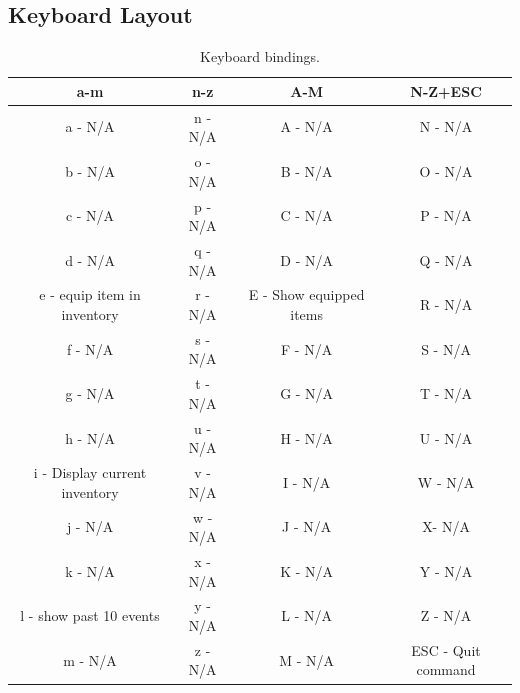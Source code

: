 \documentclass{report}
\begin{document}
\subsection{Keyboard Layout}
\begin{table}[h!]
\centering
\begin{tabular}{|c| c| c |c|} 
\hline
 a-m & n-z & A-M & N-Z+ESC \\ [0.5ex] 
 \hline
 a - N/A & n - N/A & A - N/A & N - N/A \\ 
 b - N/A & o - N/A & B - N/A & O - N/A \\
 c - N/A & p - N/A & C - N/A & P - N/A  \\
 d - N/A & q - N/A & D - N/A & Q - N/A  \\
 e - equip item in inventory & r - N/A & E - Show equipped items & R - N/A \\ 
 f - N/A & s - N/A & F - N/A & S - N/A \\
 g - N/A & t - N/A & G - N/A & T - N/A \\
 h - N/A & u - N/A & H - N/A & U - N/A \\
 i - Display current inventory & v - N/A & I - N/A & W - N/A \\
 j - N/A & w - N/A & J - N/A & X- N/A \\
 k - N/A & x - N/A & K - N/A & Y - N/A \\
 l - show past 10 events & y - N/A & L - N/A & Z - N/A \\
 m - N/A & z - N/A & M - N/A & ESC - Quit command \\ [1ex] 
 \hline
\end{tabular}
\caption{Keyboard bindings.}
\label{table:1}
\end{table}
\end{document}
